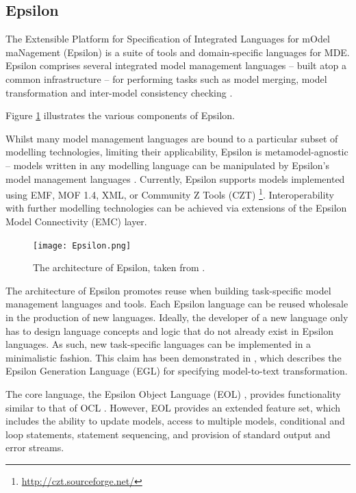 \subsection{Epsilon}
\label{subsec:epsilon}
The Extensible Platform for Specification of Integrated Languages for mOdel maNagement (Epsilon) \cite{epsilon} is a suite of tools and domain-specific languages for MDE. Epsilon comprises several integrated model management languages -- built atop a common infrastructure -- for performing tasks such as model merging, model transformation and inter-model consistency checking \cite{kolovos09thesis}. 

Figure \ref{fig:epsilon} illustrates the various components of Epsilon.

Whilst many model management languages are bound to a particular subset of modelling technologies, limiting their applicability, Epsilon is metamodel-agnostic -- models written in any modelling language can be manipulated by Epsilon's model management languages \cite{kolovos06eol}. Currently, Epsilon supports models implemented using EMF, MOF 1.4, XML, or Community Z Tools (CZT) \footnote{\url{http://czt.sourceforge.net/}}. Interoperability with further modelling technologies can be achieved via extensions of the Epsilon Model Connectivity (EMC) layer. 

\begin{figure}[htbp]
  \begin{center}
    \leavevmode
    \texttt{[image: Epsilon.png]}
  \end{center}
  \caption{The architecture of Epsilon, taken from \cite{rose08egl}.}
  \label{fig:epsilon}
\end{figure}

The architecture of Epsilon promotes reuse when building task-specific model management languages and tools.  Each Epsilon language can be reused wholesale in the production of new languages. Ideally, the developer of a new language only has to design language concepts and logic that do not already exist in Epsilon languages. As such, new task-specific languages can be implemented in a minimalistic fashion. This claim has been demonstrated in \cite{rose08egl}, which describes the Epsilon Generation Language (EGL) for specifying model-to-text transformation.

The core language, the Epsilon Object Language (EOL) \cite{kolovos06eol}, provides functionality similar to that of OCL \cite{ocl2}. However, EOL provides an extended feature set, which includes the ability to update models, access to multiple models, conditional and loop statements, statement sequencing, and provision of standard output and error streams.

